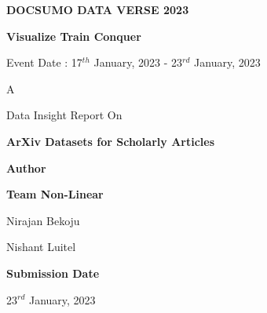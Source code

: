 \begin{titlepage}
    \begin{center}
        \vspace*{1cm}
            
        \textbf{DOCSUMO DATA VERSE 2023}

        \textbf{Visualize Train Conquer}

        Event Date : 17$^{th}$ January, 2023 - 23$^{rd}$ January, 2023
         
        \vspace{3cm}
        A

        Data Insight Report On

        \textbf{ArXiv Datasets for Scholarly Articles}
        \vspace{1.5cm}
            
        \textbf{Author}

        \textbf{Team Non-Linear}

        Nirajan Bekoju

        Nishant Luitel

        \vspace{3cm}
        \textbf{Submission Date}

        23$^{rd}$ January, 2023
    \end{center}
\end{titlepage}

\tableofcontents
\listoffigures
\listoftables